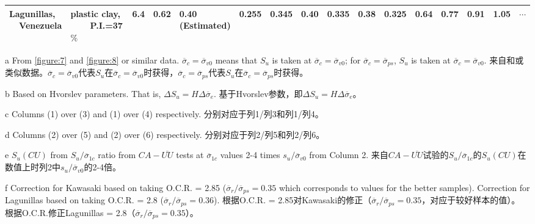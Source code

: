\begin{sidewaystable}[p]
\begin{threeparttable}
{\begin{tabular}{llllllllllllllll}
            \makecell[l]{Lagunillas, \\~~Venezuela}            & \makecell[l]{plastic clay,\\~~~~P.I.=37$\%$}   & 6.4                         & 0.62                       & \makecell[l]{0.40\\(Estimated)}                       & 0.255\tnote{h}                         & 0.345                          & 0.40              & 0.335             & 0.38              & 0.325              & 0.64                      & 0.77                      &  0.91                      & 1.05                      & $\cdots$                    \\
            \bottomrule
        \end{tabular}}%
        \begin{tablenotes}
            \item[a] From \autoref{figure:7} and \autoref{figure:8} or similar data. $\overline{\sigma}_c=\overline{\sigma}_{v0}$ means that $S_u$ is taken at $\overline{\sigma}_c=\overline{\sigma}_{v0}$; for $\overline{\sigma}_c=\overline{\sigma}_{ps}$, $S_u$ is taken at $\overline{\sigma}_c=\overline{\sigma}_{v0}$. 来自和或类似数据。$\overline{\sigma}_c=\overline{\sigma}_{v0}$代表$S_u$在$\overline{\sigma}_c=\overline{\sigma}_{v0}$时获得，$\overline{\sigma}_c=\overline{\sigma}_{ps}$代表$S_u$在$\overline{\sigma}_c=\overline{\sigma}_{ps}$时获得。
            \item[b] Based on Hvorslev parameters. That is, $\Delta{S_u}=H\Delta{\overline{\sigma}_e}$. 基于Hvorslev参数，即$\Delta{S_u}=H\Delta{\overline{\sigma}_e}$。
            \item[c] Columns (1) over (3) and (1) over (4) respectively. 分别对应于列1/列3和列1/列4。
            \item[d] Columns (2) over (5) and (2) over (6) respectively. 分别对应于列2/列5和列2/列6。
            \item[e] $S_u(CU)$ from $S_u/\overline{\sigma}_{1c}$ ratio from $CA-\overline{UU}$ tests at $\overline{\sigma}_{1c}$ values 2-4 times $s_u/\overline{\sigma}_{v0}$ from Column 2. 来自$CA-\overline{UU}$试验的$S_u/\overline{\sigma}_{1c}$的$S_u(CU)$在数值上时列2中$s_u/\overline{\sigma}_{v0}$的2-4倍。
            \item[f] Correction for Kawasaki based on taking O.C.R. = 2.85 ($\overline{\sigma}_r/\overline{\sigma}_{ps}=0.35$ which corresponds to values for the better samples). Correction for Lagunillas based on taking O.C.R. = 2.8 ($\overline{\sigma}_r/\overline{\sigma}_{ps}=0.36$). 根据O.C.R. = 2.85对Kawasaki的修正（$\overline{\sigma}_r/\overline{\sigma}_{ps}=0.35$，对应于较好样本的值）。 根据O.C.R.修正Lagunillas  = 2.8（$\overline{\sigma}_r/\overline{\sigma}_{ps}=0.35$）。

\end{tablenotes}
\end{threeparttable}
\end{sidewaystable}
